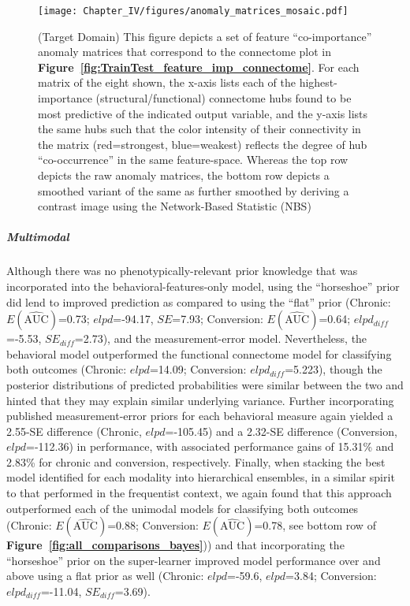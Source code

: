 \documentclass[
  notitlepage]{article}
\begin{document}
\begin{sidewaysfigure}
\centering
\texttt{[image: Chapter\_IV/figures/anomaly\_matrices\_mosaic.pdf]}
\caption{(Target Domain) \label{fig:AnomalyMatricesMosaic}\scriptsize{This figure depicts a set of feature ``co-importance'' anomaly matrices that correspond to the connectome plot in \textbf{Figure~\ref{fig:TrainTest_feature_imp_connectome}}. For each matrix of the eight shown, the x-axis lists each of the highest-importance (structural/functional) connectome hubs found to be most predictive of the indicated output variable, and the y-axis lists the same hubs such that the color intensity of their connectivity in the matrix (red=strongest, blue=weakest) reflects the degree of hub ``co-occurrence'' in the same feature-space. Whereas the top row depicts the raw anomaly matrices, the bottom row depicts a smoothed variant of the same as further smoothed by deriving a contrast image using the Network-Based Statistic (NBS)~\cite{Zalesky2010}}}
\end{sidewaysfigure}
\setlength{\belowcaptionskip}{-10pt}

\hypertarget{multimodal}{%
\subparagraph{Multimodal}\label{multimodal}}
Although there was no phenotypically-relevant prior knowledge that was
incorporated into the behavioral-features-only model, using the
``horseshoe'' prior did lend to improved prediction as compared to using
the ``flat'' prior (Chronic:
\(\mathrm{\textit{E}}(\mathrm{\hat{\text{AUC}}})\)=0.73;
\(elpd\)=-94.17, \(SE\)=7.93; Conversion:
\(\mathrm{\textit{E}}(\mathrm{\hat{\text{AUC}}})\)=0.64;
\(elpd_{diff}\)=-5.53, \(SE_{diff}\)=2.73), and the measurement-error
model. Nevertheless, the behavioral model outperformed the functional
connectome model for classifying both outcomes (Chronic: \(elpd\)=14.09;
Conversion: \(elpd_{diff}\)=5.223), though the posterior distributions
of predicted probabilities were similar between the two and hinted that
they may explain similar underlying variance. Further incorporating
published measurement-error priors for each behavioral measure again
yielded a 2.55-SE difference (Chronic, \(elpd\)=-105.45) and a 2.32-SE
difference (Conversion, \(elpd\)=-112.36) in performance, with
associated performance gains of 15.31\% and 2.83\% for chronic and
conversion, respectively. Finally, when stacking the best model
identified for each modality into hierarchical ensembles, in a similar
spirit to that performed in the frequentist context, we again found that
this approach outperformed each of the unimodal models for classifying
both outcomes (Chronic:
\(\mathrm{\textit{E}}(\mathrm{\hat{\text{AUC}}})\)=0.88; Conversion:
\(\mathrm{\textit{E}}(\mathrm{\hat{\text{AUC}}})\)=0.78, see bottom row
of \textbf{Figure~\ref{fig:all_comparisons_bayes}})) and that incorporating the
``horseshoe'' prior on the super-learner improved model performance over
and above using a flat prior as well (Chronic: \(elpd\)=-59.6,
\(elpd\)=3.84; Conversion: \(elpd_{diff}\)=-11.04, \(SE_{diff}\)=3.69).
\end{document}
